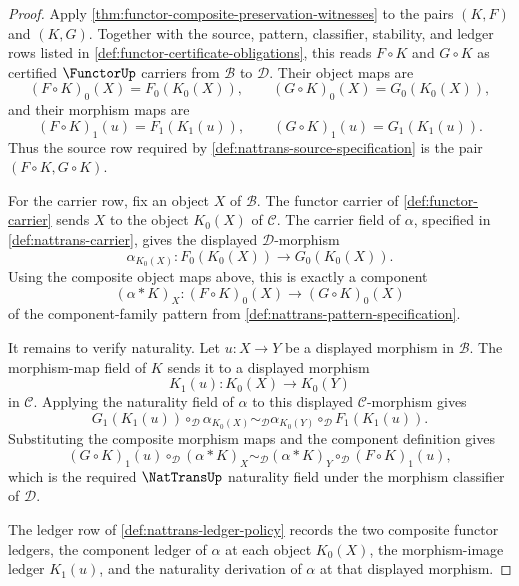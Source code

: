 \begin{proof}
Apply \autoref{thm:functor-composite-preservation-witnesses} to the pairs $(K,F)$ and $(K,G)$. Together with the source, pattern, classifier, stability, and ledger rows listed in \autoref{def:functor-certificate-obligations}, this reads $F\circ K$ and $G\circ K$ as certified $\FunctorUp$ carriers from $\mathcal B$ to $\mathcal D$. Their object maps are
$$
(F\circ K)_0(X)=F_0(K_0(X)),
\qquad
(G\circ K)_0(X)=G_0(K_0(X)),
$$
and their morphism maps are
$$
(F\circ K)_1(u)=F_1(K_1(u)),
\qquad
(G\circ K)_1(u)=G_1(K_1(u)).
$$
Thus the source row required by \autoref{def:nattrans-source-specification} is the pair $(F\circ K,G\circ K)$.

For the carrier row, fix an object $X$ of $\mathcal B$. The functor carrier of \autoref{def:functor-carrier} sends $X$ to the object $K_0(X)$ of $\mathcal C$. The carrier field of $\alpha$, specified in \autoref{def:nattrans-carrier}, gives the displayed $\mathcal D$-morphism
$$
\alpha_{K_0(X)}:F_0(K_0(X))\to G_0(K_0(X)).
$$
Using the composite object maps above, this is exactly a component
$$
(\alpha\ast K)_X:(F\circ K)_0(X)\to(G\circ K)_0(X)
$$
of the component-family pattern from \autoref{def:nattrans-pattern-specification}.

It remains to verify naturality. Let $u:X\to Y$ be a displayed morphism in $\mathcal B$. The morphism-map field of $K$ sends it to a displayed morphism
$$
K_1(u):K_0(X)\to K_0(Y)
$$
in $\mathcal C$. Applying the naturality field of $\alpha$ to this displayed $\mathcal C$-morphism gives
$$
G_1(K_1(u))\circ_{\mathcal D}\alpha_{K_0(X)}
\sim_{\mathcal D}
\alpha_{K_0(Y)}\circ_{\mathcal D}F_1(K_1(u)).
$$
Substituting the composite morphism maps and the component definition gives
$$
(G\circ K)_1(u)\circ_{\mathcal D}(\alpha\ast K)_X
\sim_{\mathcal D}
(\alpha\ast K)_Y\circ_{\mathcal D}(F\circ K)_1(u),
$$
which is the required $\NatTransUp$ naturality field under the morphism classifier of $\mathcal D$.

The ledger row of \autoref{def:nattrans-ledger-policy} records the two composite functor ledgers, the component ledger of $\alpha$ at each object $K_0(X)$, the morphism-image ledger $K_1(u)$, and the naturality derivation of $\alpha$ at that displayed morphism.
\end{proof}

